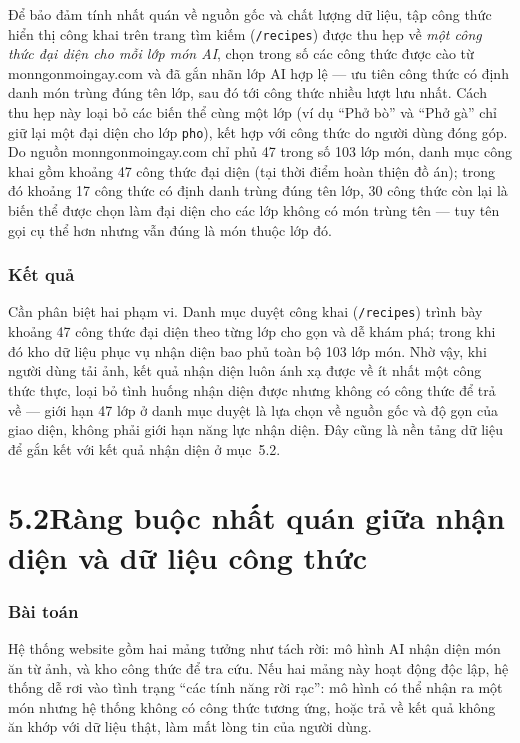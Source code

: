 \documentclass[13pt,a4paper]{article}
\begin{document}
Để bảo đảm tính nhất quán về nguồn gốc và chất lượng dữ liệu, tập công thức hiển thị công khai trên trang tìm kiếm (\texttt{/recipes}) được thu hẹp về \emph{một công thức đại diện cho mỗi lớp món AI}, chọn trong số các công thức được cào từ monngonmoingay.com và đã gắn nhãn lớp AI hợp lệ --- ưu tiên công thức có định danh món trùng đúng tên lớp, sau đó tới công thức nhiều lượt lưu nhất. Cách thu hẹp này loại bỏ các biến thể cùng một lớp (ví dụ ``Phở bò'' và ``Phở gà'' chỉ giữ lại một đại diện cho lớp \texttt{pho}), kết hợp với công thức do người dùng đóng góp. Do nguồn monngonmoingay.com chỉ phủ 47 trong số 103 lớp món, danh mục công khai gồm khoảng 47 công thức đại diện (tại thời điểm hoàn thiện đồ án); trong đó khoảng 17 công thức có định danh trùng đúng tên lớp, 30 công thức còn lại là biến thể được chọn làm đại diện cho các lớp không có món trùng tên --- tuy tên gọi cụ thể hơn nhưng vẫn đúng là món thuộc lớp đó.

\subsubsection*{Kết quả}
Cần phân biệt hai phạm vi. Danh mục duyệt công khai (\texttt{/recipes}) trình bày khoảng 47 công thức đại diện theo từng lớp cho gọn và dễ khám phá; trong khi đó kho dữ liệu phục vụ nhận diện bao phủ toàn bộ 103 lớp món. Nhờ vậy, khi người dùng tải ảnh, kết quả nhận diện luôn ánh xạ được về ít nhất một công thức thực, loại bỏ tình huống nhận diện được nhưng không có công thức để trả về --- giới hạn 47 lớp ở danh mục duyệt là lựa chọn về nguồn gốc và độ gọn của giao diện, không phải giới hạn năng lực nhận diện. Đây cũng là nền tảng dữ liệu để gắn kết với kết quả nhận diện ở mục~5.2.

\section*{5.2\quad Ràng buộc nhất quán giữa nhận diện và dữ liệu công thức}
\subsubsection*{Bài toán}
Hệ thống website gồm hai mảng tưởng như tách rời: mô hình AI nhận diện món ăn từ ảnh, và kho công thức để tra cứu. Nếu hai mảng này hoạt động độc lập, hệ thống dễ rơi vào tình trạng ``các tính năng rời rạc'': mô hình có thể nhận ra một món nhưng hệ thống không có công thức tương ứng, hoặc trả về kết quả không ăn khớp với dữ liệu thật, làm mất lòng tin của người dùng.
\end{document}
